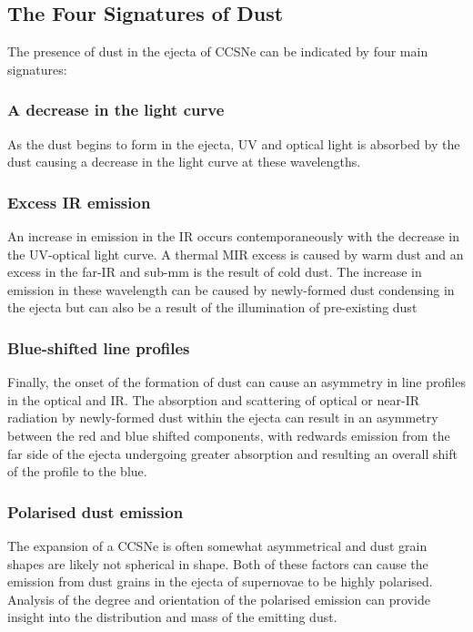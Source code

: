 
\subsection{The Four Signatures of Dust}
\label{three_sigs}


The presence of dust in the ejecta of CCSNe can be indicated by four main signatures: 

\subsubsection{A decrease in the light curve} 
As the dust begins to form in the ejecta, UV and optical light is absorbed by the dust causing a decrease in the light curve at these wavelengths.

\subsubsection{Excess IR emission}
An increase in emission in the IR occurs contemporaneously with the decrease in the UV-optical light curve.  A thermal MIR excess is caused by warm dust and an excess in the far-IR and sub-mm is the result of cold dust.  The increase in emission in these wavelength can be caused by newly-formed dust condensing in the ejecta but can also be a result of the illumination of pre-existing dust

\subsubsection{Blue-shifted line profiles}
Finally, the onset of the formation of dust can cause an asymmetry in line profiles in the optical and IR.  The absorption and scattering of optical or near-IR radiation by newly-formed dust within the ejecta can result in an asymmetry between the red and blue shifted components, with redwards 
emission from the far side of the ejecta undergoing greater absorption and resulting an overall shift of the profile to the blue.

\subsubsection{Polarised dust emission}
The expansion of a CCSNe is often somewhat asymmetrical and dust grain shapes are likely not spherical in shape.  Both of these factors can cause the emission from dust grains in the ejecta of supernovae to be highly polarised.  Analysis of the degree and orientation of the polarised emission can provide insight into the distribution and mass of the emitting dust. 
\\

